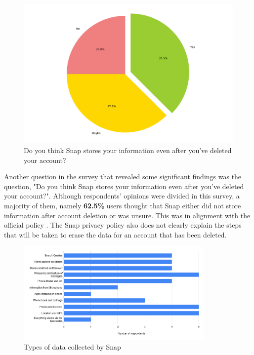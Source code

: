\documentclass[sigconf]{acmart}
\begin{document}
\begin{figure}[h]
  \centering
  \includegraphics[width=\linewidth]{snap_collect_after_delete.png}
  \caption{Do you think Snap stores your information even after you've deleted your account?}
  \label{fig:snap_data_collect}
  \Description{}
\end{figure}

Another question in the survey that revealed some significant findings was the question, "Do you think Snap stores your information even after you've deleted your account?". Although respondents' opinions were divided in this survey, a majority of them, namely \textbf{62.5\%} users thought that Snap either did not store information after account deletion or was unsure. This was in alignment with the official policy \cite{snap-policy}. The Snap privacy policy \cite{snap-policy} also does not clearly explain the steps that will be taken to erase the data for an account that has been deleted. 

\begin{figure}[h]
  \centering
  \includegraphics[height=5cm,width=\linewidth]{snap_data_type.png}
  \caption{Types of data collected by Snap}
  \label{fig:snap_data_collect}
  \Description{}
\end{figure}
\end{document}
